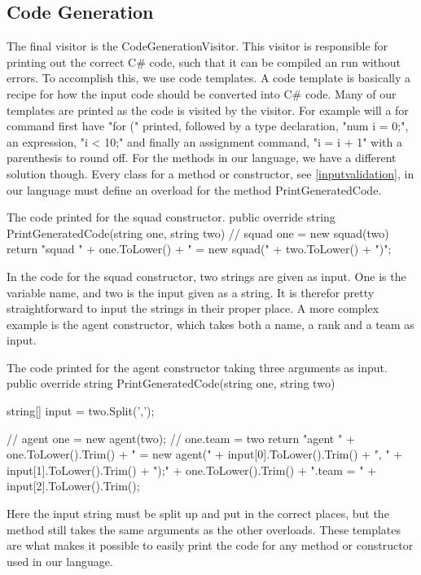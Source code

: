 \subsection{Code Generation}
The final visitor is the CodeGenerationVisitor. 
This visitor is responsible for printing out the correct C\# code, such that it can be compiled an run without errors. 
To accomplish this, we use code templates. \newline
A code template is basically a recipe for how the input code should be converted into C\# code. 
Many of our templates are printed as the code is visited by the visitor. 
For example will a for command first have "for (" printed, followed by a type declaration, "num i = 0;", an expression, "i < 10;" and finally an assignment command, "i = i + 1" with a parenthesis to round off. \newline
For the methods in our language, we have a different solution though. 
Every class for a method or constructor, see \ref{inputvalidation}, in our language must define an overload for the method PrintGeneratedCode. 

\begin{source}{The code printed for the squad constructor.}{}
public override string PrintGeneratedCode(string one, string two)
        {
            // squad one = new squad(two)
            return "squad " + one.ToLower() + " = new squad(" + two.ToLower() + ")";
        }
\end{source}

In the code for the squad constructor, two strings are given as input. 
One is the variable name, and two is the input given as a string. 
It is therefor pretty straightforward to input the strings in their proper place. 
A more complex example is the agent constructor, which takes both a name, a rank and a team as input.

\begin{source}{The code printed for the agent constructor taking three arguments as input.}{}
public override string PrintGeneratedCode(string one, string two)
        {
            string[] input = two.Split(',');
						
            // agent one = new agent(two);
            // one.team = two
            return "agent " + one.ToLower().Trim() + 
							" = new agent(" + input[0].ToLower().Trim() + 
							", " + input[1].ToLower().Trim() + ");\n" + 
							one.ToLower().Trim() + ".team = " + 
							input[2].ToLower().Trim();
        }
\end{source}

Here the input string must be split up and put in the correct places, but the method still takes the same arguments as the other overloads. 
These templates are what makes it possible to easily print the code for any method or constructor used in our language.